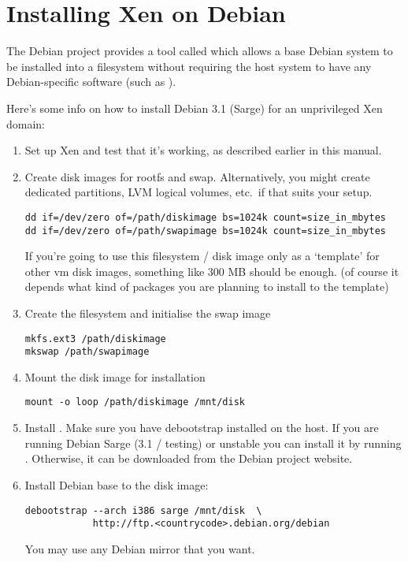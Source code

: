 \chapter{Installing Xen on Debian}

The Debian project provides a tool called  which
allows a base Debian system to be installed into a filesystem without
requiring the host system to have any Debian-specific software (such as
).

Here's some info on how to install Debian 3.1 (Sarge) for an
unprivileged Xen domain:

\begin{enumerate}

\item Set up Xen and test that it's working, as described earlier in
  this manual.

\item Create disk images for rootfs and swap. Alternatively, you might
  create dedicated partitions, LVM logical volumes, etc.\ if that suits
  your setup.
\begin{verbatim}
dd if=/dev/zero of=/path/diskimage bs=1024k count=size_in_mbytes
dd if=/dev/zero of=/path/swapimage bs=1024k count=size_in_mbytes
\end{verbatim}
  If you're going to use this filesystem / disk image only as a
  `template' for other vm disk images, something like 300 MB should be
  enough. (of course it depends what kind of packages you are planning
  to install to the template)

\item Create the filesystem and initialise the swap image
\begin{verbatim}
mkfs.ext3 /path/diskimage
mkswap /path/swapimage
\end{verbatim}

\item Mount the disk image for installation
\begin{verbatim}
mount -o loop /path/diskimage /mnt/disk
\end{verbatim}

\item Install . Make sure you have debootstrap
  installed on the host. If you are running Debian Sarge (3.1 / testing)
  or unstable you can install it by running . Otherwise, it can be downloaded from the Debian
  project website.

\item Install Debian base to the disk image:
\begin{verbatim}
debootstrap --arch i386 sarge /mnt/disk  \
            http://ftp.<countrycode>.debian.org/debian
\end{verbatim}
  You may use any Debian mirror that you want.


\end{enumerate}
